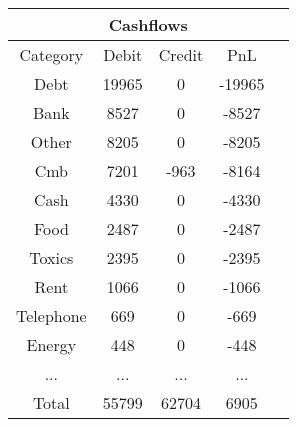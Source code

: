 \begin{longtable}{|c|c|c|c|c|}
\hline
\multicolumn{5}{|c|}{Cashflows} \\
\hline
Category & Debit & Credit & PnL \\
\hline
Debt & 19965 & 0 & -19965\\
\hline
Bank & 8527 & 0 & -8527\\
\hline
Other & 8205 & 0 & -8205\\
\hline
Cmb & 7201 & -963 & -8164\\
\hline
Cash & 4330 & 0 & -4330\\
\hline
Food & 2487 & 0 & -2487\\
\hline
Toxics & 2395 & 0 & -2395\\
\hline
Rent & 1066 & 0 & -1066\\
\hline
Telephone & 669 & 0 & -669\\
\hline
Energy & 448 & 0 & -448\\
\hline
 ... & ... & ... & ...\\
\hline
 Total & 55799 & 62704 & 6905 \\
\hline
\end{longtable}
